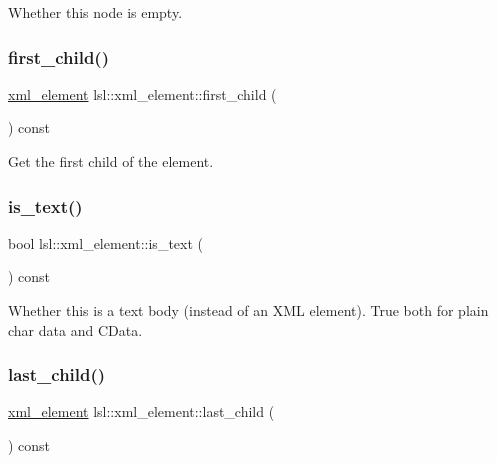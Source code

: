 Whether this node is empty. 

\mbox{\label{classlsl_1_1xml__element_ab68b7a1c63c2cb0eb4ce6361b94469b7}} 
\subsubsection{\texorpdfstring{first\+\_\+child()}{first\_child()}}
{\footnotesize\ttfamily \hyperlink{classlsl_1_1xml__element}{xml\+\_\+element} lsl\+::xml\+\_\+element\+::first\+\_\+child (\begin{DoxyParamCaption}{ }\end{DoxyParamCaption}) const\hspace{0.3cm}{\ttfamily [inline]}}



Get the first child of the element. 

\mbox{\label{classlsl_1_1xml__element_a965cfff9a29ebe6d8274f5256ff0017c}} 
\subsubsection{\texorpdfstring{is\+\_\+text()}{is\_text()}}
{\footnotesize\ttfamily bool lsl\+::xml\+\_\+element\+::is\+\_\+text (\begin{DoxyParamCaption}{ }\end{DoxyParamCaption}) const\hspace{0.3cm}{\ttfamily [inline]}}



Whether this is a text body (instead of an X\+ML element). True both for plain char data and C\+Data. 

\mbox{\label{classlsl_1_1xml__element_a12254f735a79a11b75718fe7c28186d0}} 
\subsubsection{\texorpdfstring{last\+\_\+child()}{last\_child()}}
{\footnotesize\ttfamily \hyperlink{classlsl_1_1xml__element}{xml\+\_\+element} lsl\+::xml\+\_\+element\+::last\+\_\+child (\begin{DoxyParamCaption}{ }\end{DoxyParamCaption}) const\hspace{0.3cm}{\ttfamily [inline]}}



